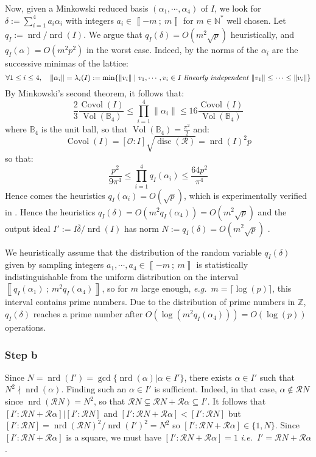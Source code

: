 \documentclass[a4paper,10pt]{report}
\theoremstyle{definition}
\theoremstyle{plain}
\theoremstyle{definition}
\newcommand{\ie}{\emph{i.e.}\ }
\newcommand{\eg}{\emph{e.g.}\ }
\newcommand{\N}{\mathbb{N}}
\newcommand{\Z}{\mathbb{Z}}
\newcommand{\B}{\mathbb{B}}
\newcommand{\m}[1]{\mathcal{#1}}
\newcommand{\mO}{\mathcal{O}}
\renewcommand{\i}[2]{\left\llbracket #1~;~#2\right\rrbracket}
\renewcommand{\(}{\left(}
\renewcommand{\)}{\right)}
\DeclareMathOperator{\disc}{disc}
\DeclareMathOperator{\nrd}{nrd}
\DeclareMathOperator{\Vol}{Vol}
\DeclareMathOperator{\Covol}{Covol}
\begin{document}
Now, given a Minkowski reduced basis $(\alpha_1, \cdots, \alpha_4)$ of $I$, we look for $\delta:=\sum_{i=1}^4 a_i\alpha_i$ with integers $a_i\in\i{-m}{m}$ for $m\in\N^*$ well chosen.  Let $q_I:=\nrd/\nrd(I)$. We argue that $q_I(\delta)=O(m^2\sqrt{p})$ heuristically, and $q_I(\alpha)=O(m^2p^2)$ in the worst case.  Indeed, by \cite[Teil I.  § 7]{VDW}
the norms of the $\alpha_i$ are the successive minimas of the lattice:
\[\forall 1\leq i\leq 4, \quad \|\alpha_i\|=\lambda_i(I):=\min\{\|v_i\|\mid v_1, \cdots, v_i\in I \emph{ linearly independent } \|v_1\|\leq\cdots\leq\|v_i\|\}\]
By Minkowski's second theorem, it follows that:
\[\frac{2}{3}\frac{\Covol(I)}{\Vol(\B_4)}\leq \prod_{i=1}^4\|\alpha_i\|\leq 16\frac{\Covol(I)}{\Vol(\B_4)}\]
where $\B_4$ is the unit ball, so that $\Vol(\B_4)=\frac{\pi^2}{2}$ and:
\[\Covol(I)=[\mO:I]\sqrt{\disc(\m{R})}=\nrd(I)^2p\]
so that:
\[\frac{p^2}{9\pi^4}\leq \prod_{i=1}^4q_I(\alpha_i)\leq \frac{64p^2}{\pi^4}\]
Hence comes the heuristics $q_I(\alpha_i)=O(\sqrt{p})$, which is experimentally verified in \cite{KLPT}. Hence the heuristics $q_I(\delta)=O(m^2q_I(\alpha_4))=O(m^2\sqrt{p})$ and the output ideal $I':=I\overline{\delta}/\nrd(I)$ has norm $N:=q_I(\delta)=O(m^2\sqrt{p})$ .


We heuristically assume that the distribution of the random variable $q_I(\delta)$ given by sampling integers $a_1,\cdots,a_4\in\i{-m}{m}$ is statistically indistinguishable from the uniform distribution on the interval $\i{q_I(\alpha_1)}{m^2 q_I(\alpha_4)}$, so for $m$ large enough, \eg $m=\lceil \log(p)\rceil$, this interval contains prime numbers. Due to the distribution of prime numbers in $\Z$, $q_I(\delta)$ reaches a prime number after $O(\log(m^2 q_I(\alpha_4)))=O(\log(p))$ operations. 

\subsubsection{Step b}

Since $N=\nrd(I')=\gcd\{\nrd(\alpha)|\alpha\in I'\}$, there exists $\alpha\in I'$ such that $N^2\nmid\nrd(\alpha)$. Finding such an $\alpha\in I'$ is sufficient. Indeed, in that case, $\alpha\not\in \m{R}N$ since $\nrd(\m{R}N)=N^2$, so that $\m{R}N\subsetneq \m{R}N+\m{R}\alpha\subseteq I'$. It follows that $[I':\m{R}N+\m{R}\alpha]|[I':\m{R}N]$ and $[I':\m{R}N+\m{R}\alpha]<[I':\m{R}N]$ but $[I':\m{R}N]=\nrd(\m{R}N)^2/\nrd(I')^2=N^2$ so $[I':\m{R}N+\m{R}\alpha]\in \{1,N\}$. Since $[I':\m{R}N+\m{R}\alpha]$ is a square, we must have $[I':\m{R}N+\m{R}\alpha]=1$ \ie $I'=\m{R}N+\m{R}\alpha$.
\end{document}
